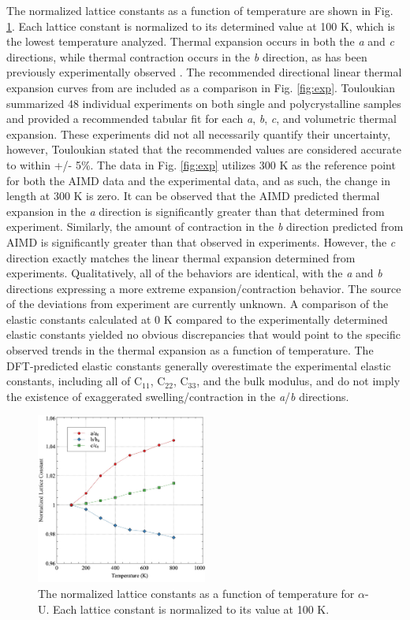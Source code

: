 \documentclass[utf8]{frontiersSCNS} %
\begin{document}
The normalized lattice constants as a function of temperature are shown in Fig. \ref{fig:a0}. Each lattice constant is normalized to its determined value at 100 K, which is the lowest temperature analyzed. Thermal expansion occurs in both the \textit{a} and \textit{c} directions, while thermal contraction occurs in the \textit{b} direction, as has been previously experimentally observed \cite{touloukian}. The recommended directional linear thermal expansion curves from \cite{touloukian} are included as a comparison in Fig. \ref{fig:exp}. Touloukian summarized 48 individual experiments on both single and polycrystalline samples and provided a recommended tabular fit for each \textit{a}, \textit{b}, \textit{c}, and volumetric thermal expansion. These experiments did not all necessarily quantify their uncertainty, however, Touloukian stated that the recommended values are considered accurate to within +/- 5\%. The data in Fig. \ref{fig:exp} utilizes 300 K as the reference point for both the AIMD data and the experimental data, and as such, the change in length at 300 K is zero. It can be observed that the AIMD predicted thermal expansion in the \textit{a} direction is significantly greater than that determined from experiment. Similarly, the amount of contraction in the \textit{b} direction predicted from AIMD is significantly greater than that observed in experiments. However, the \textit{c} direction exactly matches the linear thermal expansion determined from experiments. Qualitatively, all of the behaviors are identical, with the \textit{a} and \textit{b} directions expressing a more extreme expansion/contraction behavior. The source of the deviations from experiment are currently unknown. A comparison of the elastic constants calculated at 0 K \cite{beeler2013}compared to the experimentally determined elastic constants \cite{fisher1958} yielded no obvious discrepancies that would point to the specific observed trends in the thermal expansion as a function of temperature. The DFT-predicted elastic constants generally overestimate the experimental elastic constants, including all of C$_{11}$, C$_{22}$, C$_{33}$, and the bulk modulus, and do not imply the existence of exaggerated swelling/contraction in the \textit{a}/\textit{b} directions.

 \begin{figure}[hbt]
	\centering
	\includegraphics[width=0.5\textwidth]{a0_norm.jpg}
    \caption{The normalized lattice constants as a function of temperature for $\alpha$-U. Each lattice constant is normalized to its value at 100 K.}\label{fig:a0}
\end{figure}
\end{document}
